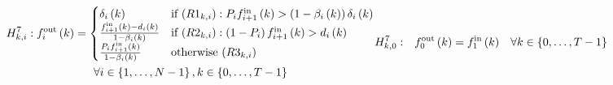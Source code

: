 \begin{subequations}
\begin{multline}
\stdH{7}: 
\flowout{\icell}{\itime}
=\begin{cases}
\celldemand{\icell}{\itime} 
& \text{if } (\R{1}{\itime}{\icell}) : \priority{\icell}\flowin{\icell+1}{\itime} > \left(1-\offrampratio{\icell}{\itime}\right)\celldemand{\icell}{\itime}
\\
\frac{\flowin{\icell+1}{\itime}-\rampdemand{\icell}{\itime}}{1-\offrampratio{\icell}{\itime}}
& \text{if } (\R{2}{\itime}{\icell}) : \left(1-\priority{\icell}\right)\flowin{\icell+1}{\itime} > \rampdemand{\icell}{\itime}
\\
\frac{\priority{\icell}\flowin{\icell+1}{\itime}}{1-\offrampratio{\icell}{\itime}} & \text{otherwise } (\R{3}{\itime}{\icell})
\end{cases} \\
\forall\icell\in\left\{ 1,\ldots,\ncell-1\right\} ,\itime\in\left\{ 0,\ldots,\ntime-1\right\}
\label{eq:junctionPriority}
\end{multline}
\begin{align}
\H{7}{\itime}{0}: && \flowout{0}{\itime} & =\flowin{1}{\itime} &
\forall \itime \in \left \{ 0, \dots, \ntime-1 \right\}
\label{eq:junctionFlowConservationSpecial1}	
\end{align}
\end{subequations}





\setcounter{equation}{\theoldequation}
\renewcommand{\theequation}{\arabic{equation}}



